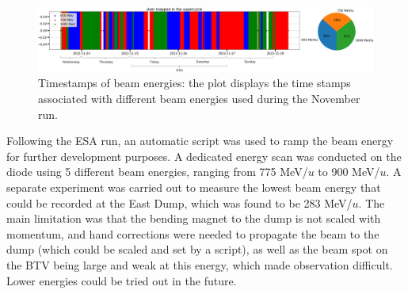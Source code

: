\documentclass{cernatsnote}
\begin{document}
\begin{figure}[!htb]
\centering
\includegraphics[width=1.0\textwidth]{images/PS_BEAM_ENERGY/user_mapping_timestamp.png}
\caption{Timestamps of beam energies: the plot displays the time stamps associated with different beam energies used during the November run.}
\label{fig:timestamp_energies}
\end{figure}

Following the ESA run, an automatic script was used to ramp the beam energy for further development purposes. A dedicated energy scan was conducted on the diode using 5 different beam energies, ranging from 775 MeV/$u$ to 900 MeV/$u$. A separate experiment was carried out to measure the lowest beam energy that could be recorded at the East Dump, which was found to be 283 MeV/$u$. The main limitation was that the bending magnet to the dump is not scaled with momentum, and hand corrections were needed to propagate the beam to the dump (which could be scaled and set by a script), as well as the beam spot on the BTV being large and weak at this energy, which made observation difficult. Lower energies could be tried out in the future.
\end{document}
